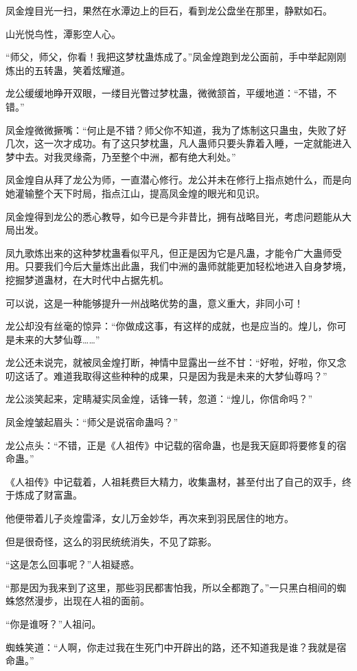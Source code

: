\begin{this_body}
凤金煌目光一扫，果然在水潭边上的巨石，看到龙公盘坐在那里，静默如石。

山光悦鸟性，潭影空人心。

“师父，师父，你看！我把这梦枕蛊炼成了。”凤金煌跑到龙公面前，手中举起刚刚炼出的五转蛊，笑着炫耀道。

龙公缓缓地睁开双眼，一缕目光瞥过梦枕蛊，微微颔首，平缓地道：“不错，不错。”

凤金煌微微撅嘴：“何止是不错？师父你不知道，我为了炼制这只蛊虫，失败了好几次，这一次才成功。有了这只梦枕蛊，凡人蛊师只要头靠着入睡，一定就能进入梦中去。对我灵缘斋，乃至整个中洲，都有绝大利处。”

凤金煌自从拜了龙公为师，一直潜心修行。龙公并未在修行上指点她什么，而是向她灌输整个天下时局，指点江山，提高凤金煌的眼光和见识。

凤金煌得到龙公的悉心教导，如今已是今非昔比，拥有战略目光，考虑问题能从大局出发。

凤九歌炼出来的这种梦枕蛊看似平凡，但正是因为它是凡蛊，才能令广大蛊师受用。只要我们今后大量炼出此蛊，我们中洲的蛊师就能更加轻松地进入自身梦境，挖掘梦道蛊材，在大时代中占据先机。

可以说，这是一种能够提升一州战略优势的蛊，意义重大，非同小可！

龙公却没有丝毫的惊异：“你做成这事，有这样的成就，也是应当的。煌儿，你可是未来的大梦仙尊……”

龙公还未说完，就被凤金煌打断，神情中显露出一丝不甘：“好啦，好啦，你又念叨这话了。难道我取得这些种种的成果，只是因为我是未来的大梦仙尊吗？”

龙公淡笑起来，定睛凝实凤金煌，话锋一转，忽道：“煌儿，你信命吗？”

凤金煌皱起眉头：“师父是说宿命蛊吗？”

龙公点头：“不错，正是《人祖传》中记载的宿命蛊，也是我天庭即将要修复的宿命蛊。”

《人祖传》中记载着，人祖耗费巨大精力，收集蛊材，甚至付出了自己的双手，终于炼成了财富蛊。

他便带着儿子炎煌雷泽，女儿万金妙华，再次来到羽民居住的地方。

但是很奇怪，这么的羽民统统消失，不见了踪影。

“这是怎么回事呢？”人祖疑惑。

“那是因为我来到了这里，那些羽民都害怕我，所以全都跑了。”一只黑白相间的蜘蛛悠然漫步，出现在人祖的面前。

“你是谁呀？”人祖问。

蜘蛛笑道：“人啊，你走过我在生死门中开辟出的路，还不知道我是谁？我就是宿命蛊。”


\end{this_body}
